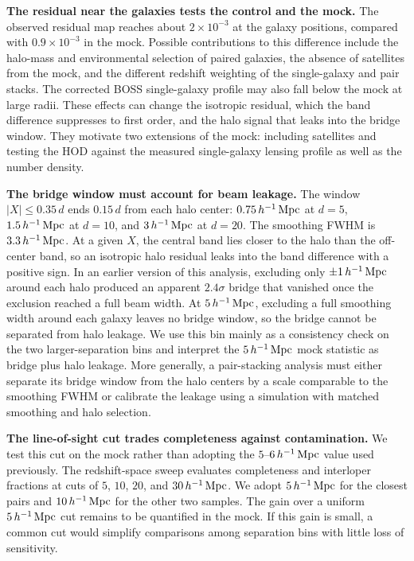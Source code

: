 \textbf{The residual near the galaxies tests the control and the mock.}
The observed residual map reaches about $2\times10^{-3}$ at the galaxy
positions, compared with $0.9\times10^{-3}$ in the mock. %
Possible contributions to this difference include the halo-mass and
environmental selection of paired galaxies, the absence of satellites from
the mock, and the different redshift weighting of the single-galaxy and pair
stacks. The corrected BOSS single-galaxy profile may also fall below the mock
at large radii. %
These effects can change the isotropic residual, which the band difference
suppresses to first order, and the halo signal that leaks
into the bridge window. They motivate two extensions of the mock: including
satellites and testing the HOD against the measured single-galaxy lensing
profile as well as the number density.

\textbf{The bridge window must account for beam leakage.} The window
$|X|\leq0.35\,d$ ends $0.15\,d$ from each halo center: $0.75\,h^{-1}\,{\rm Mpc}$ at
$d=5$, $1.5\,h^{-1}\,{\rm Mpc}$ at $d=10$, and $3\,h^{-1}\,{\rm Mpc}$ at $d=20$. The smoothing
FWHM is $3.3\,h^{-1}\,{\rm Mpc}$. At a given $X$, the central band lies closer to the
halo than the off-center band, so an isotropic
halo residual leaks into the band difference with a positive sign. In an
earlier version of this analysis, excluding only $\pm1\,h^{-1}\,{\rm Mpc}$ around
each halo produced an apparent $2.4\sigma$ bridge that vanished once the
exclusion reached a full beam width. %
At $5\,h^{-1}\,{\rm Mpc}$, excluding a full smoothing width around each galaxy leaves
no bridge window, so the bridge cannot be separated from halo leakage. We use
this bin mainly as a consistency check on the two larger-separation bins and
interpret the $5\,h^{-1}\,{\rm Mpc}$ mock statistic as bridge plus halo leakage.
More generally, a pair-stacking analysis must either separate its bridge
window from the halo centers by a scale comparable to the smoothing FWHM or
calibrate the leakage using a simulation with matched smoothing and halo
selection.

\textbf{The line-of-sight cut trades completeness against contamination.}
We test this cut on the mock rather than adopting the
$5$--$6\,h^{-1}\,{\rm Mpc}$ value used previously. The redshift-space sweep evaluates
completeness and interloper fractions at cuts of $5$, $10$, $20$, and
$30\,h^{-1}\,{\rm Mpc}$.
We adopt
$5\,h^{-1}\,{\rm Mpc}$ for the closest pairs and $10\,h^{-1}\,{\rm Mpc}$ for the other two
samples.
The gain over a uniform $5\,h^{-1}\,{\rm Mpc}$ cut remains to be quantified in the
mock. %
If this gain is small, a common cut would simplify comparisons
among separation bins with little loss of sensitivity.

